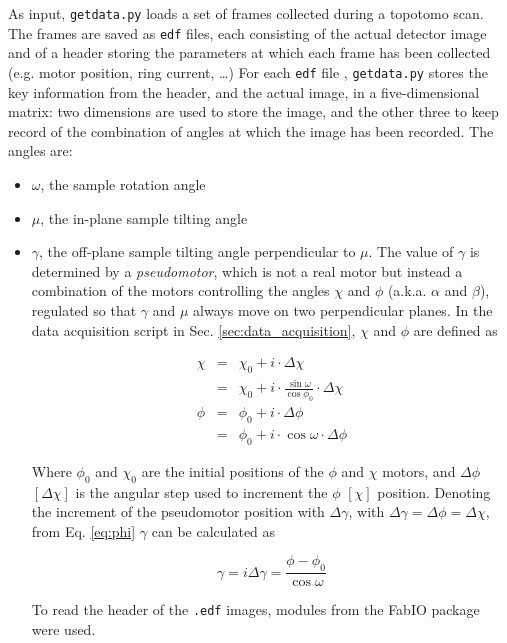 \documentclass[11pt]{scrartcl}
\begin{document}
As input, {\texttt{getdata.py}} loads a set of frames collected during a topotomo scan. The frames are saved as {\texttt{edf}} files, each consisting of the actual detector image and of a header storing the parameters at which each frame has been collected (e.g. motor position, ring current, \ldots) For each {\texttt{edf}} file , {\texttt{getdata.py}} stores the key information from the header, and the actual image, in a five-dimensional matrix: two dimensions are used to store the image, and the other three to keep record of the combination of angles at which the image has been recorded. The angles are:
\begin{itemize}
    \item $\omega$, the sample rotation angle
    \item $\mu$, the in-plane sample tilting angle
    \item $\gamma$, the off-plane sample tilting angle perpendicular to $\mu$. The value of $\gamma$ is determined by a {\emph{pseudomotor}}, which is not a real motor but instead a combination of the motors controlling the angles $\chi$ and $\phi$ (a.k.a. $\alpha$ and $\beta$), regulated so that $\gamma$ and $\mu$ always move on two perpendicular planes. In the data acquisition script in Sec. \ref{sec:data_acquisition}, $\chi$ and $\phi$ are defined as 
    
    \begin{eqnarray}
        \chi & = & \chi_0 + i \cdot \Delta \chi \label{eq:chi} \\
             & = & \chi_0 + i \cdot \frac{\sin\omega}{\cos\phi_0} \cdot \Delta\chi \\
        \phi & = & \phi_0 + i \cdot \Delta \phi \label{eq:phi} \\ 
             & = & \phi_0 + i \cdot \cos\omega \cdot \Delta\phi
    \end{eqnarray}
    
    Where $\phi_0$ and $\chi_0$ are the initial positions of the $\phi$ and $\chi$ motors, and $\Delta\phi$ $[\Delta\chi]$ is the angular step used to increment the $\phi$ $[\chi]$ position. Denoting the increment of the pseudomotor position with $\Delta\gamma$, with $\Delta\gamma = \Delta\phi = \Delta\chi$, from Eq. \ref{eq:phi} $\gamma$ can be calculated as 
 
    \begin{equation}
        \gamma = i \Delta\gamma = \frac{\phi - \phi_0}{\cos\omega}
    \end{equation}
    
    To read the header of the {\texttt{.edf}} images, modules from the FabIO\cite{knudsen2013fabio} package were used.
    
\end{itemize}
\end{document}
